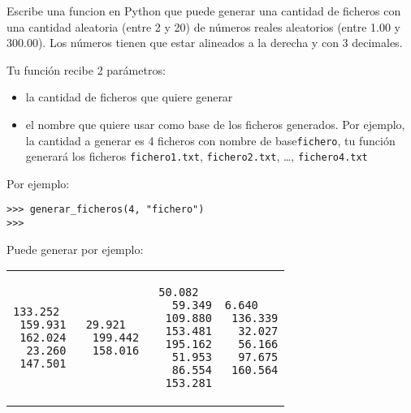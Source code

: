 \begin{ejercicio}
\label{generate_ficheros}
Escribe una funcion  en Python que puede generar una cantidad de ficheros con una cantidad aleatoria (entre 2 y 20) de números reales aleatorios (entre 1.00 y 300.00). Los números tienen que estar alineados a la derecha y con 3 decimales. 


Tu función recibe 2 parámetros: 

\begin{itemize}
    \item la cantidad de ficheros que quiere generar
    \item el nombre que quiere usar como base de los ficheros generados. Por ejemplo, la cantidad a generar es 4 ficheros con nombre de base\texttt{fichero}, tu función generará los ficheros \texttt{fichero1.txt}, \texttt{fichero2.txt}, \dots, \texttt{fichero4.txt}
\end{itemize}

Por ejemplo:\\

\begin{Verbatim}[frame=single, label={\em ejemplo de sesión interactiva}]
>>> generar_ficheros(4, "fichero")
>>> 
\end{Verbatim}

Puede generar por ejemplo:\\

\begin{tabular}{p{3cm}p{3cm}p{3cm}p{3cm}}

\begin{Verbatim}[frame=single, label={\em fichero1.txt}]
 133.252 
 159.931 
 162.024 
  23.260 
 147.501 
\end{Verbatim}
&
\begin{Verbatim}[frame=single, label={\em fichero2.txt}]
  29.921 
 199.442 
 158.016 
\end{Verbatim}
&
\begin{Verbatim}[frame=single, label={\em fichero3.txt}]
  50.082 
  59.349
 109.880
 153.481
 195.162
  51.953
  86.554
 153.281
\end{Verbatim}
&
\begin{Verbatim}[frame=single, label={\em fichero4.txt}]
   6.640
 136.339
  32.027
  56.166
  97.675
 160.564
\end{Verbatim}
\end{tabular}

\end{ejercicio}

